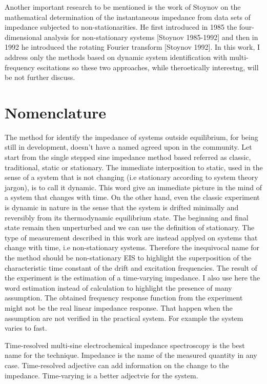 Another important research to be mentioned is the work of Stoynov on the mathematical determination of the instantaneous impedance from data sets of impedance subjected to non-stationarities. He first introduced in 1985 the four-dimensional analysis for non-stationary systems [Stoynov 1985-1992] and then in 1992 he introduced the rotating Fourier transform [Stoynov 1992].
In this work, I address only the methods based on dynamic system identification with multi-frequency escitations so these two approaches, while theroetically interestng, will be not further discuss. 


\section{Nomenclature}

The method for identify the impedance of systems outside equilibrium, for being still in development, doesn't have a named agreed upon in the community. Let start from the single stepped sine impedance method based referred as classic, traditional, static or stationary. The immediate interposition to static, used in the sense of a system that is not changing (i.e stationary according to system theory jargon), is to call it dynamic. This word give an immediate picture in the mind of a system that changes with time. On the other hand, even the classic experiment is dynamic in nature in the sense that the system is drifted minimally and reversibly from its thermodynamic equilibrium state. The beginning and final state remain then unperturbed and we can use the definition of stationary. The type of measurement described in this work are instead applyed on systems that change with time, i.e non-stationary systems. Therefore the inequivocal name for the method should be non-stationary EIS to highlight the superposition of the characteristic time constant of the drift and excitation frequencies. The result of the experiment is the estimation of a time-varying impedance. I also use here the word estimation instead of calculation to highlight the presence of many assumption. The obtained frequency response function from the experiment might not be the real linear impedance response. That happen when the assumption are not verified in the practical system. For example the system varies to fast.

Time-resolved multi-sine electrochemical impedance spectroscopy is the best name for the technique. Impedance is the name of the measured quantity in any case. Time-resolved adjective can add information on the change to the impedance. Time-varying is a better adjectvie for the system.

